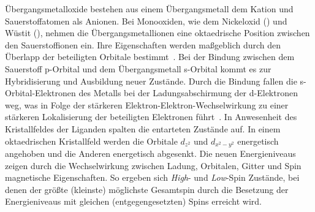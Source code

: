         Übergangsmetalloxide bestehen aus einem Übergangsmetall dem Kation und Sauerstoffatomen als Anionen.
        Bei Monooxiden, wie dem Nickeloxid () und Wüstit (), nehmen die Übergangsmetallionen eine oktaedrische Position zwischen den Sauerstoffionen ein.
        Ihre Eigenschaften werden maßgeblich durch den Überlapp der beteiligten Orbitale bestimmt~\cite{kupper_electronic_2005}.
        Bei der Bindung zwischen dem Sauerstoff p-Orbital und dem Übergangsmetall s-Orbital kommt es zur Hybridisierung und Ausbildung neuer Zustände.
        Durch die Bindung fallen die s-Orbital-Elektronen des Metalls bei der Ladungsabschirmung der d-Elektronen weg, was in Folge der stärkeren Elektron-Elektron-Wechselwirkung zu einer stärkeren Lokalisierung der beteiligten Elektronen führt~\cite{dane_beschreibung_2008}.
        In Anwesenheit des Kristallfeldes der Liganden spalten die entarteten Zustände auf.
        In einem oktaedrischen Kristallfeld werden die Orbitale $d_{z^2}$ und $d_{x^2-y^2}$ energetisch angehoben und die Anderen energetisch abgesenkt.
        Die neuen Energieniveaus zeigen durch die Wechselwirkung zwischen Ladung, Orbitalen, Gitter und Spin magnetische Eigenschaften.
        So ergeben sich \textit{High}- und \textit{Low}-Spin Zustände, bei denen der größte (kleinste) möglichste Gesamtspin durch die Besetzung der Energieniveaus mit gleichen (entgegengesetzten) Spins erreicht wird.

